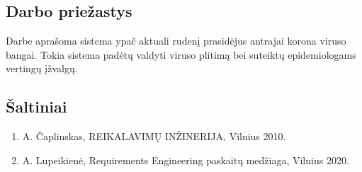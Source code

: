 \documentclass{VUMIFPSkursinis}
\begin{document}
\subsection{Darbo priežastys}
Darbe aprašoma sistema ypač aktuali rudenį prasidėjus antrajai korona viruso bangai. Tokia sistema padėtų 
valdyti viruso plitimą bei suteiktų epidemiologams vertingų įžvalgų.

\subsection{Šaltiniai}
\begin{enumerate}
	\item A. Čaplinskas, REIKALAVIMŲ INŽINERIJA, Vilnius 2010.
	\item A. Lupeikienė, Requirements Engineering paskaitų medžiaga, Vilnius 2020.
\end{enumerate}

\newpage
\end{document}
